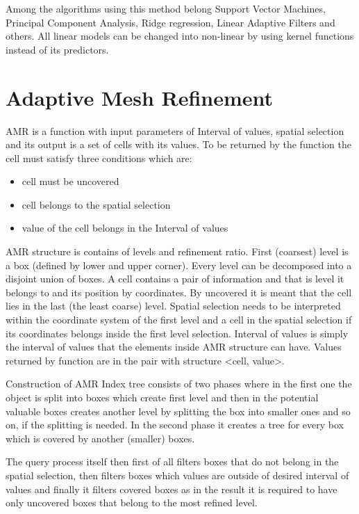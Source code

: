 Among the algorithms using this method belong Support Vector Machines, Principal Component Analysis, Ridge regression, Linear Adaptive Filters and others. All linear models can be changed into non-linear by using kernel functions instead of its predictors. \cite{kernel} \cite{machineLearning}


\section{Adaptive Mesh Refinement}
AMR is a function with input parameters of Interval of values, spatial selection and its output is a set of cells with its values. To be returned by the function the cell must satisfy three conditions which are:
\begin{itemize}
\item cell must be uncovered
\item cell belongs to the spatial selection
\item value of the cell belongs in the Interval of values
\end{itemize}
AMR structure is contains of levels and refinement ratio. \cite{AMRindexing} First (coarsest) level is a box (defined by lower and upper corner). Every level can be decomposed into a disjoint union of boxes. A cell contains a pair of information and that is level it belongs to and its position by coordinates. By uncovered it is meant that the cell lies in the last (the least coarse) level. Spatial selection needs to be interpreted within the coordinate system of the first level and a cell in the spatial selection if its coordinates belongs inside the first level selection. Interval of values is simply the interval of values that the elements inside AMR structure can have. Values returned by function are in the pair with structure <cell, value>.

Construction of AMR Index tree consists of two phases where in the first one the object is split into boxes which create first level and then in the potential valuable boxes creates another level by splitting the box into smaller ones and so on, if the splitting is needed. In the second phase it creates a tree for every box which is covered by another (smaller) boxes.

The query process itself then first of all filters boxes that do not belong in the spatial selection, then filters boxes which values are outside of desired interval of values and finally it filters covered boxes as in the result it is required to have only uncovered boxes that belong to the most refined level.

